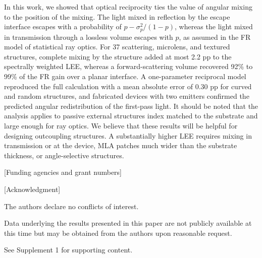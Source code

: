 \documentclass{optica-article}
\begin{document}
In this work, we showed that optical reciprocity ties the value of angular mixing to the position of the mixing. The light mixed in reflection by the escape interface escapes with a probability of $p - \sigma_p^2/(1-p)$, whereas the light mixed in transmission through a lossless volume escapes with $p$, as assumed in the FR model of statistical ray optics. For 37 scattering, microlens, and textured structures, complete mixing by the structure added at most 2.2 pp to the spectrally weighted LEE, whereas a forward-scattering volume recovered 92\% to 99\% of the FR gain over a planar interface. A one-parameter reciprocal model reproduced the full calculation with a mean absolute error of 0.30 pp for curved and random structures, and fabricated devices with two emitters confirmed the predicted angular redistribution of the first-pass light. It should be noted that the analysis applies to passive external structures index matched to the substrate and large enough for ray optics. We believe that these results will be helpful for designing outcoupling structures. A substantially higher LEE requires mixing in transmission or at the device, MLA patches much wider than the substrate thickness, or angle-selective structures.

\begin{backmatter}

[Funding agencies and grant numbers]


[Acknowledgment]


The authors declare no conflicts of interest.


Data underlying the results presented in this paper are not publicly available at this time but may be obtained from the authors upon reasonable request.


See Supplement 1 for supporting content.


\end{backmatter}
\end{document}
